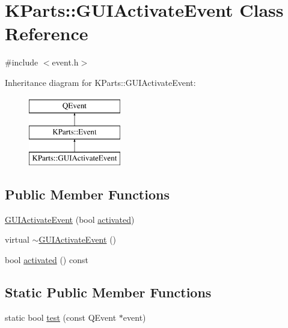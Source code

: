 \hypertarget{classKParts_1_1GUIActivateEvent}{\section{K\+Parts\+:\+:G\+U\+I\+Activate\+Event Class Reference}
\label{classKParts_1_1GUIActivateEvent}
}


{\ttfamily \#include $<$event.\+h$>$}

Inheritance diagram for K\+Parts\+:\+:G\+U\+I\+Activate\+Event\+:\begin{figure}[H]
\begin{center}
\leavevmode
\includegraphics[height=3.000000cm]{classKParts_1_1GUIActivateEvent}
\end{center}
\end{figure}
\subsection*{Public Member Functions}
\begin{DoxyCompactItemize}
\item 
\hyperlink{classKParts_1_1GUIActivateEvent_a303f43218976a3af5612b127b7cdb06d}{G\+U\+I\+Activate\+Event} (bool \hyperlink{classKParts_1_1GUIActivateEvent_a6656d719771003b7877dc1137da82beb}{activated})
\item 
virtual \hyperlink{classKParts_1_1GUIActivateEvent_a26879d8d165ab17efcb773f0dce94d18}{$\sim$\+G\+U\+I\+Activate\+Event} ()
\item 
bool \hyperlink{classKParts_1_1GUIActivateEvent_a6656d719771003b7877dc1137da82beb}{activated} () const 
\end{DoxyCompactItemize}
\subsection*{Static Public Member Functions}
\begin{DoxyCompactItemize}
\item 
static bool \hyperlink{classKParts_1_1GUIActivateEvent_a360a35ee2b385c6b615e909e4a885e83}{test} (const Q\+Event $\ast$event)
\end{DoxyCompactItemize}


